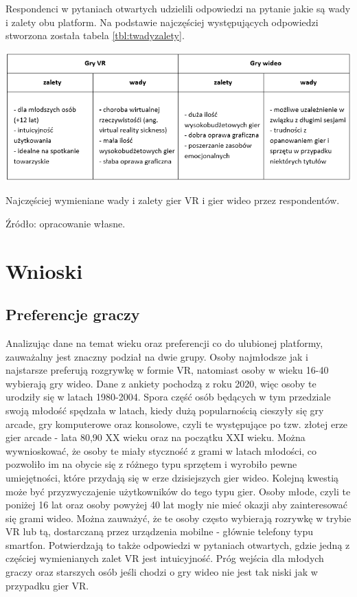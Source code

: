 Respondenci w pytaniach otwartych udzielili odpowiedzi na pytanie jakie są wady i zalety obu platform. Na podstawie najczęściej występujących odpowiedzi stworzona została tabela  \ref{tbl:twadyzalety}.

\begin{table}[htb]
  \centering
  \includegraphics[width=1\textwidth]{images/twadyzalety.PNG}
  \caption{Najczęściej wymieniane wady i zalety gier VR i gier wideo przez respondentów.}
  \caption*{Źródło: opracowanie własne.}
  \label{tbl:twadyzalety}
\end{table}

   

    
    
\section{Wnioski}

\subsection{Preferencje graczy}

Analizując dane na temat wieku oraz preferencji co do ulubionej platformy, zauważalny jest znaczny podział na dwie grupy. Osoby najmłodsze jak i najstarsze preferują rozgrywkę w formie VR, natomiast osoby w wieku 16-40 wybierają gry wideo. Dane z ankiety pochodzą z roku 2020, więc osoby te urodziły się w latach 1980-2004. Spora część osób będących w tym przedziale swoją młodość spędzała w latach, kiedy dużą popularnością cieszyły się gry arcade, gry komputerowe oraz konsolowe, czyli te występujące po tzw. złotej erze gier arcade - lata 80,90 XX wieku oraz na początku XXI wieku.  Można wywnioskować, że osoby te miały styczność z grami w latach młodości, co pozwoliło im na obycie się z różnego typu sprzętem i wyrobiło pewne umiejętności, które przydają się w erze dzisiejszych gier wideo. Kolejną kwestią może być przyzwyczajenie użytkowników do tego typu gier. Osoby młode, czyli te poniżej 16 lat oraz osoby powyżej 40 lat mogły nie mieć okazji aby zainteresować się grami wideo. Można zauważyć, że te osoby często wybierają rozrywkę w trybie VR lub tą, dostarczaną przez urządzenia mobilne - głównie telefony typu smartfon. Potwierdzają to także odpowiedzi w pytaniach otwartych, gdzie jedną z częściej wymienianych zalet VR jest intuicyjność. Próg wejścia dla młodych graczy oraz starszych osób jeśli chodzi o gry wideo nie jest tak niski jak w przypadku gier VR.

